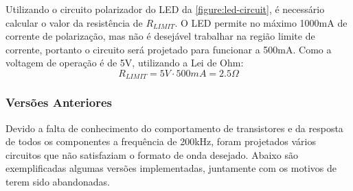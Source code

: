 	Utilizando o circuito polarizador do LED da \autoref{figure:led-circuit}, é necessário calcular o valor da resistência de $R_{LIMIT}$. O LED permite no máximo 1000mA de corrente de polarização, mas não é desejável trabalhar na região limite de corrente, portanto o circuito será projetado para funcionar a 500mA. Como a voltagem de operação é de 5V, utilizando a Lei de Ohm:
	\begin{equation}
	R_{LIMIT} = 5V \cdot 500mA = 2.5\Omega
	\end{equation}
	
	\subsubsection{Versões Anteriores}
	
	Devido a falta de conhecimento do comportamento de transistores e da resposta de todos os componentes a frequência de 200kHz, foram projetados vários circuitos que não satisfaziam o formato de onda desejado. Abaixo são exemplificadas algumas versões implementadas, juntamente com os motivos de terem sido abandonadas.
	
